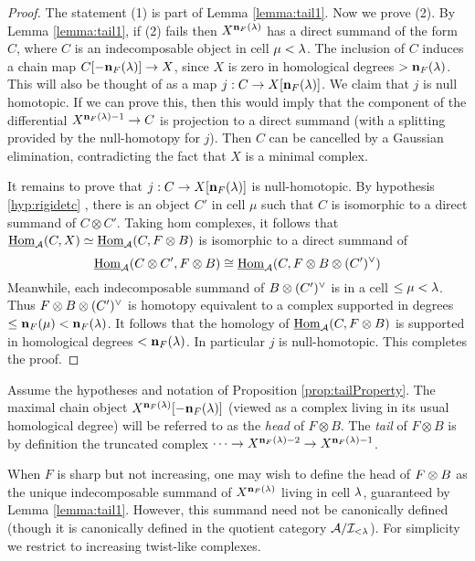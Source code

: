 \begin{proof} The statement (1) is part of Lemma \ref{lemma:tail1}. Now we prove (2). By Lemma \ref{lemma:tail1}, if (2) fails then $X^{{\mathbf n}_F(\lambda)}$ has a direct summand of the form $C$, where $C$ is an indecomposable object in cell $\mu < \lambda$. The inclusion of $C$ induces a chain map $C[-{\mathbf n}_F(\lambda)]\rightarrow X$, since $X$ is zero in homological degrees $>{\mathbf n}_F(\lambda)$. This will also be thought of as a map $j:C\rightarrow X[{\mathbf n}_F(\lambda)]$. We claim that $j$ is null homotopic. If we can prove this, then this would imply that the component of the differential $X^{{\mathbf n}_F(\lambda)-1}\rightarrow C$ is projection to a direct summand (with a splitting provided by the null-homotopy for $j$). Then $C$ can be cancelled by a Gaussian
elimination, contradicting the fact that $X$ is a minimal complex.

It remains to prove that $j:C\rightarrow X[{\mathbf n}_F(\lambda)]$ is null-homotopic.  By hypothesis \ref{hyp:rigidetc} , there is an object $C'$ in cell $\mu$ such that $C$ is isomorphic to a direct summand of $C \otimes C'$.  Taking hom complexes, it follows that $\underline{\operatorname{Hom}}_{{\mathcal{A}}}(C,X)\simeq \underline{\operatorname{Hom}}_{{\mathcal{A}}}(C, F\otimes B)$ is isomorphic to a direct summand of
\[
\underline{\operatorname{Hom}}_{{\mathcal{A}}}(C\otimes C', F\otimes B)\cong \underline{\operatorname{Hom}}_{{\mathcal{A}}}(C, F\otimes B \otimes (C')^\vee)
\]
Meanwhile, each indecomposable summand of $B \otimes (C')^\vee$ is in a cell $\le \mu < \lambda$. Thus $F\otimes B \otimes (C')^\vee$ is homotopy equivalent to a complex supported in degrees $\leq {\mathbf n}_F(\mu)<{\mathbf n}_F(\lambda)$. It follows that the homology of $\underline{\operatorname{Hom}}_{{\mathcal{A}}}(C, F\otimes B)$ is supported in homological degrees $<{\mathbf n}_F(\lambda)$.  In particular $j$ is null-homotopic.  This completes the proof.
\end{proof}


\begin{definition}\label{def:head} Assume the hypotheses and notation of Proposition \ref{prop:tailProperty}. The maximal chain object $X^{{\mathbf n}_F(\lambda)}[-{\mathbf n}_F(\lambda)]$ (viewed as a complex
living in its usual homological degree) will be referred to as the \emph{head} of $F\otimes B$. The \emph{tail} of $F\otimes B$ is by definition the truncated complex $\cdots \rightarrow
X^{{\mathbf n}_F(\lambda)-2}\rightarrow X^{{\mathbf n}_F(\lambda)-1}$. \end{definition}

\begin{remark} When $F$ is sharp but not increasing, one may wish to define the head of $F \otimes B$ as the unique indecomposable summand of $X^{{\mathbf n}_F(\lambda)}$ living in cell $\lambda$, guaranteed by Lemma \ref{lemma:tail1}. However, this summand need not be canonically defined (though it is canonically defined in the quotient category ${\mathcal{A}} / {\mathcal{I}}_{< \lambda}$).  For simplicity we restrict to increasing  twist-like complexes. %
\end{remark}


